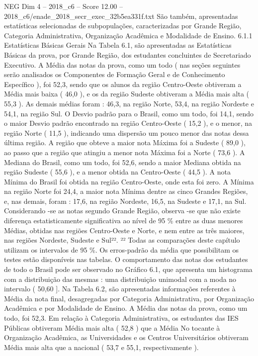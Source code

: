\begin{textsample}{NEG Dim 4 – 2018\_c6 – Score 12.00 – 2018\_c6/enade\_2018\_secr\_exec\_32b5ea331f.txt}
São também, apresentadas estatísticas selecionadas de subpopulações, caracterizadas por Grande Região, Categoria Administrativa, Organização Acadêmica e Modalidade de Ensino. 6.1.1 Estatísticas Básicas Gerais Na Tabela 6.1, são apresentadas as Estatísticas Básicas da prova, por Grande Região, dos estudantes concluintes de Secretariado Executivo.
A Média das notas da prova, como um todo ( nas seções seguintes serão analisados os Componentes de Formação Geral e de Conhecimento Específico ), foi 52,3, sendo que os alunos da região Centro-Oeste obtiveram a Média mais baixa ( 46,0 ), e os da região Sudeste obtiveram a Média mais alta ( 55,3 ).
As demais médias foram : 46,3, na região Norte, 53,4, na região Nordeste e 54,1, na região Sul.
O Desvio padrão para o Brasil, como um todo, foi 14,1, sendo o maior Desvio padrão encontrado na região Centro-Oeste ( 15,2 ), e o menor, na região Norte ( 11,5 ), indicando uma dispersão um pouco menor das notas dessa última região.
A região que obteve a maior nota Máxima foi a Sudeste ( 89,0 ), ao passo que a região que atingiu a menor nota Máxima foi a Norte ( 73,6 ).
A Mediana do Brasil, como um todo, foi 52,6, sendo a maior Mediana obtida na região Sudeste ( 55,6 ), e a menor obtida na Centro-Oeste ( 44,5 ).
A nota Mínima do Brasil foi obtida na região Centro-Oeste, onde esta foi zero.
A Mínima na região Norte foi 24,4, a maior nota Mínima dentre as cinco Grandes Regiões, e, nas demais, foram : 17,6, na região Nordeste, 16,5, na Sudeste e 17,1, na Sul.
Considerando -se as notas segundo Grande Região, observa -se que não existe diferença estatisticamente significativa ao nível de 95 \% entre as duas menores Médias, obtidas nas regiões Centro-Oeste e Norte, e nem entre as três maiores, nas regiões Nordeste, Sudeste e Sul²². ²² Todas as comparações deste capítulo utilizam os intervalos de 95 \%.
Os erros-padrão da média que possibilitam os testes estão disponíveis nas tabelas.
O comportamento das notas dos estudantes de todo o Brasil pode ser observado no Gráfico 6.1, que apresenta um histograma com a distribuição das mesmas : uma distribuição unimodal com a moda no intervalo ( 50,60 ].
Na Tabela 6.2, são apresentadas informações referentes à Média da nota final, desagregadas por Categoria Administrativa, por Organização Acadêmica e por Modalidade de Ensino.
A Média das notas da prova, como um todo, foi 52,3.
Em relação à Categoria Administrativa, os estudantes das IES Públicas obtiveram Média mais alta ( 52,8 ) que a Média No tocante à Organização Acadêmica, as Universidades e os Centros Universitários obtiveram Média mais alta que a nacional ( 53,7 e 55,1, respectivamente ).

\end{textsample}
